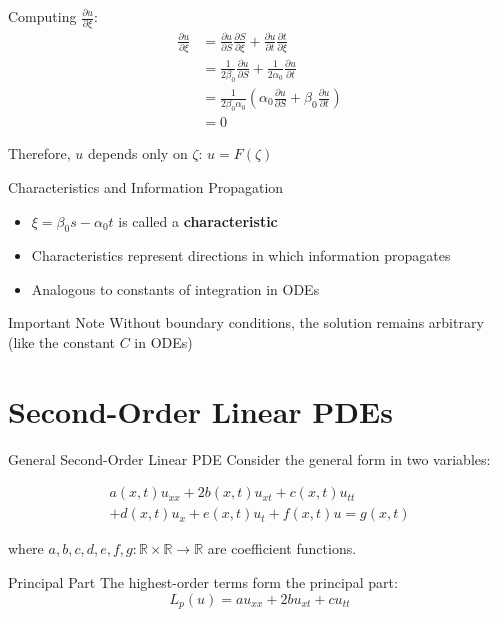 \documentclass{beamer}
\begin{document}
\begin{frame}
    Computing $\frac{\partial u}{\partial \xi}$:
\begin{align} 
        \frac{\partial u}{\partial \xi} &= \frac{\partial u}{\partial S} \frac{\partial S}{\partial \xi} + \frac{\partial u}{\partial t} \frac{\partial t}{\partial \xi} \\
        & = \frac{1}{2\beta_0} \frac{\partial u}{\partial S} + \frac{1}{2\alpha_0} \frac{\partial u}{\partial t} \\
        & = \frac{1}{2\beta_0 \alpha_0} \left( \alpha_0 \frac{\partial u}{\partial S} + \beta_0\frac{\partial u}{\partial t}\right) \\
        & = 0
\end{align}
    
    Therefore, $u$ depends only on $\zeta$: $u = F(\zeta)$
\end{frame}

\begin{frame}{Characteristics and Information Propagation}
    \begin{itemize}
        \item $\xi = \beta_0s - \alpha_0t$ is called a \textbf{characteristic}
        \item Characteristics represent directions in which information propagates
        \item Analogous to constants of integration in ODEs
    \end{itemize}
    
    \begin{alertblock}{Important Note}
        Without boundary conditions, the solution remains arbitrary (like the constant $C$ in ODEs)
    \end{alertblock}
\end{frame}


\section{Second-Order Linear PDEs}

\begin{frame}{General Second-Order Linear PDE}
    Consider the general form in two variables:


    \begin{multline}
        a(x,t)u_{xx} 
        + 2b(x,t)u_{xt} 
        + c(x,t)u_{tt} 
        \\
        + d(x,t)u_x 
        + e(x,t)u_t 
        + f(x,t)u 
        = g(x,t)
    \end{multline}

    where $a,b,c,d,e,f,g: \mathbb{R} \times \mathbb{R} \rightarrow \mathbb{R}$ are coefficient functions.
    
    \begin{block}{Principal Part}
        The highest-order terms form the principal part:
        \[
        L_p(u) = a u_{xx} + 2b u_{xt} + c u_{tt}
        \]
    \end{block}
\end{frame}
\end{document}
